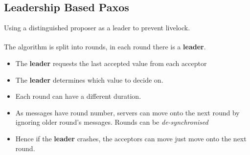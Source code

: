 
\subsection{Leadership Based Paxos}
Using a distinguished proposer as a leader to prevent livelock.
\\
\\ The algorithm is split into rounds, in each round there is a \textbf{leader}.
\begin{itemize}
    \item The \textbf{leader} requests the last accepted value from each acceptor
    \item The \textbf{leader} determines which value to decide on.
    \item Each round can have a different duration.
    \item As messages have round number, servers can move onto the next round by ignoring older round's messages. Rounds can be \textit{de-synchronised}
    \item Hence if the \textbf{leader} crashes, the acceptors can move just move onto the next round.
\end{itemize}
\unfinished





